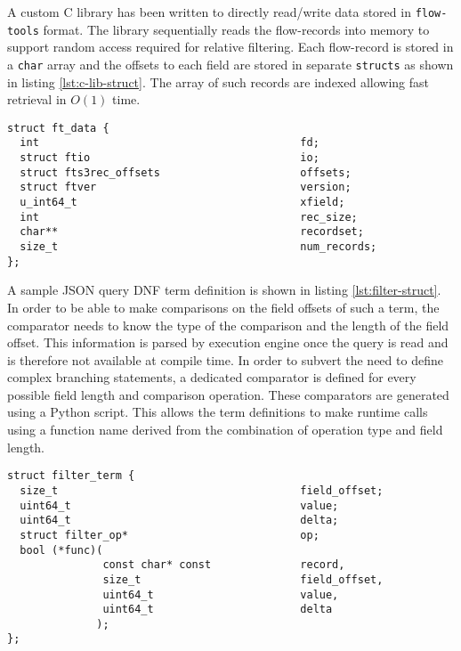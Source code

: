 A custom C library has been written to directly read/write data stored in
\texttt{flow-tools} format. The library sequentially reads the flow-records
into memory to support random access required for relative filtering. Each
flow-record is stored in a \texttt{char} array and the offsets to each field
are stored in separate \texttt{structs} as shown in listing
\ref{lst:c-lib-struct}. The array of such records are indexed allowing fast
retrieval in $O(1)$ time.

\begin{lstlisting}
struct ft_data {
  int                                         fd;
  struct ftio                                 io;
  struct fts3rec_offsets                      offsets;
  struct ftver                                version;
  u_int64_t                                   xfield;
  int                                         rec_size;
  char**                                      recordset;
  size_t                                      num_records;
};
\end{lstlisting}

A sample JSON query \ac{DNF} term definition is shown in listing
\ref{lst:filter-struct}. In order to be able to make comparisons on the field
offsets of such a term, the comparator needs to know the type of the
comparison and the length of the field offset. This information is parsed by
execution engine once the query is read and is therefore not available at
compile time.  In order to subvert the need to define complex branching
statements, a dedicated comparator is defined for every possible field length
and comparison operation. These comparators are generated using a Python
script. This allows the term definitions to make runtime calls using a
function name derived from the combination of operation type and field length.

\begin{lstlisting}
struct filter_term {
  size_t                                      field_offset;
  uint64_t                                    value;
  uint64_t                                    delta;
  struct filter_op*                           op;
  bool (*func)(
               const char* const              record,
               size_t                         field_offset,
               uint64_t                       value,
               uint64_t                       delta
              );
};
\end{lstlisting}

